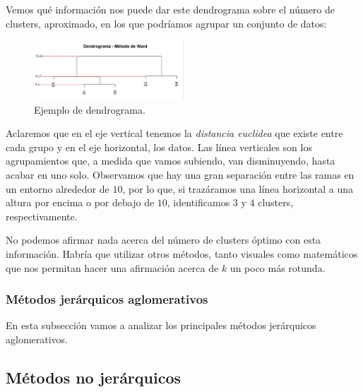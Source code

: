 \begin{ejemplo}

    Vemos qué información nos puede dar este dendrograma sobre el número de clusters, aproximado, en los que podríamos agrupar un conjunto de datos:

    \begin{figure}[h]
        \centering
        \includegraphics[width=0.5\textwidth]{../img/dendrograma.png}
        \caption{Ejemplo de dendrograma.}
    \end{figure}

    \FloatBarrier

    Aclaremos que en el eje vertical tenemos la \textit{distancia euclidea} que existe entre cada grupo y en el eje horizontal, los datos. Las línea verticales son los
    agrupamientos que, a medida que vamos subiendo, van disminuyendo, hasta acabar en uno solo. Observamos que hay una gran separación entre las ramas en un entorno alrededor
    de $10$, por lo que, si trazáramos una línea horizontal a una altura por encima o por debajo de $10$, identificamos $3$ y $4$ clusters, respectivamente. \newline

    No podemos afirmar nada acerca del número de clusters óptimo con esta información. Habría que utilizar otros métodos, tanto visuales como matemáticos que nos permitan
    hacer una afirmación acerca de $k$ un poco más rotunda.

\end{ejemplo}


\subsubsection{Métodos jerárquicos aglomerativos}

En esta subsección vamos a analizar los principales métodos jerárquicos aglomerativos. 



\subsection{Métodos no jerárquicos}



